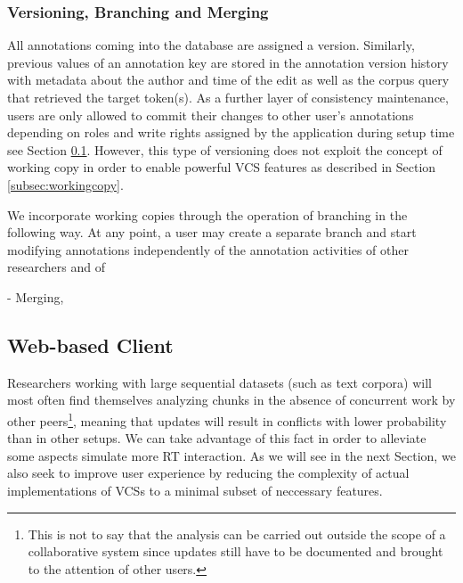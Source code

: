 \documentclass{sig-alternate}
\begin{document}

\subsubsection{Versioning, Branching and Merging}\label{subsec:dbversion}

All annotations coming into the database are assigned a version. Similarly, previous values
of an annotation key are stored in the annotation version history with metadata about the author
and time of the edit as well as the corpus query that retrieved the target token(s).
As a further layer of consistency maintenance, users are only allowed to commit their changes
to other user's annotations depending on roles and write rights assigned by the application during
setup time \textemdash see Section \ref{subsec:client}.
However, this type of versioning does not exploit the concept of working copy in order to enable
powerful VCS features as described in Section \ref{subsec:workingcopy}.

We incorporate working copies through the operation of branching in the following way. At any point,
a user may create a separate branch and start modifying annotations independently of the annotation
activities of other researchers and of

- Merging,

\subsection{Web-based Client}\label{subsec:client}

Researchers working with large sequential datasets (such as text corpora) will most often find
themselves analyzing chunks in the absence of concurrent work by other peers\footnote{
  This is not to say that the analysis can be carried out outside the scope of a collaborative system
  since updates still have to be documented and brought to the attention of other users.
}, meaning that updates will result in conflicts with lower probability than in other setups.
We can take advantage of this fact in order to alleviate some aspects 
simulate more RT interaction.
As we will see in the next Section, we also seek to improve user experience by reducing the
complexity of actual implementations of VCSs to a minimal subset of neccessary features.
\end{document}
